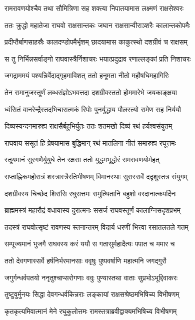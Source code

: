 \twolineshloka
{रामरावणयोश्चैव तथा सौमित्रिणा सह}
{शक्त्या निपातयामास लक्ष्मणं राक्षसेश्वरः}%

\twolineshloka
{ततः क्रुद्धो महातेजा राघवो राक्षसान्तकः}
{जघान राक्षसान्वीराञ्शरैः कालान्तकोपमैः}%

\twolineshloka
{प्रदीप्तैर्बाणसाहस्रैः कालदण्डोपमैर्भृशम्}
{छादयामास काकुत्स्थो दशग्रीवं च राक्षसम्}%

\twolineshloka
{स तु निर्भिन्नसर्वाङ्गो राघवास्त्रैर्निशाचरः}
{भयात्प्रदुद्राव रणाल्लङ्कां प्रति निशाचरः}%

\twolineshloka
{जगद्राममयं पश्यन्निर्वेदाद्गृहमाविशत्}
{ततो हनूमता नीतो महौषधिमहागिरिः}%

\twolineshloka
{तेन रामानुजस्तूर्णं लब्धसंज्ञोऽभवत्तदा}
{दशग्रीवस्ततो होममारेभे जयकाङ्क्षया}%

\twolineshloka
{ध्वंसितं वानरेन्द्रैस्तदभिचारात्मकं रिपोः}
{पुनर्युद्धाय पौलस्त्यो रामेण सह निर्ययौ}%

\twolineshloka
{दिव्यस्यन्दनमारुह्य राक्षसैर्बहुभिर्युतः}
{ततः शतमखो दिव्यं रथं हर्यश्वसंयुतम्}%

\twolineshloka
{राघवाय ससूतं हि प्रेषयामास बुद्धिमान्}
{रथं मातलिना नीतं समारुह्य रघूत्तमः}%

\twolineshloka
{स्तूयमानं सुरगणैर्युयुधे तेन रक्षसा}
{ततो युद्धमभूद्धोरं रामरावणयोर्महत्}%

\twolineshloka
{सप्ताह्निकमहोरात्रं शस्त्रास्त्रैरतिभीषणम्}
{विमानस्थाः सुरास्सर्वे ददृशुस्तत्र संयुगम्}%

\twolineshloka
{दशग्रीवस्य चिच्छेद शिरांसि रघुसत्तमः}
{समुत्थितानि बहुशो वरदानात्कपर्दिनः}%

\twolineshloka
{ब्राह्ममस्त्रं महारौद्रं वधायास्य दुरात्मनः}
{ससर्ज राघवस्तूर्णं कालाग्निसदृशप्रभम्}%

\twolineshloka
{तदस्त्रं राघवोत्सृष्टं रावणस्य स्तनान्तरम्}
{विदार्य धरणीं भित्त्वा रसातलतले गतम्}%

\twolineshloka
{सम्पूज्यमानं भुजगै राघवस्य करं ययौ}
{स गतासुर्महादैत्यः पपात च ममार च}%

\twolineshloka
{ततो देवगणास्सर्वे हर्षनिर्भरमानसाः}
{ववृषुः पुष्पवर्षाणि महात्मनि जगद्गुरौ}%

\twolineshloka
{जगुर्गन्धर्वपतयो ननृतुश्चाप्सरोगणाः}
{ववुः पुण्यास्तथा वाताः सुप्रभोऽभूद्दिवाकरः}%

\twolineshloka
{तुष्टुवुर्मुनयः सिद्धा देवगन्धर्वकिन्नराः}
{लङ्कायां राक्षसश्रेष्ठमभिषिच्य विभीषणम्}%

\twolineshloka
{कृतकृत्यमिवात्मानं मेने रघुकुलोत्तमः}
{रामस्तत्राब्रवीद्वाक्यमभिषिच्य विभीषणम्}%

